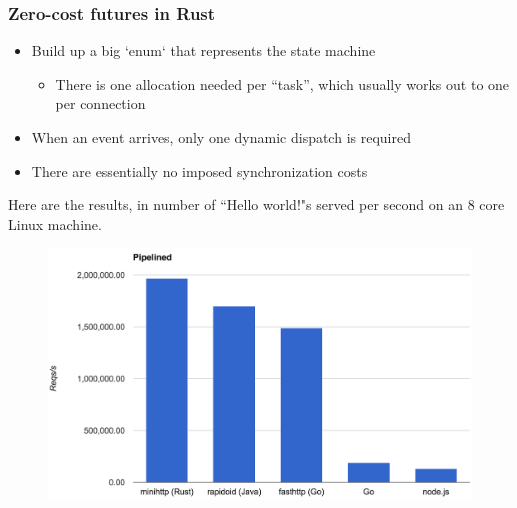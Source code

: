 \begin{frame}[fragile]
    \frametitle{Zero-cost futures in Rust}
% 
% 
    \begin{itemize}
        \item Build up a big `enum` that represents the state machine
    	\begin{itemize}
    	    \item There is one allocation needed per “task”, which usually works out to one per connection
    	\end{itemize}
        \item When an event arrives, only one dynamic dispatch is required
        \item There are essentially no imposed synchronization costs
    \end{itemize}
% 
Here are the results, in number of “Hello world!"s served per second on an 8 core Linux machine.
% 
    \begin{figure}
    \includegraphics[width=0.8\linewidth]{figs/bench-pipelined.png}
    \end{figure}
% 
\end{frame}

